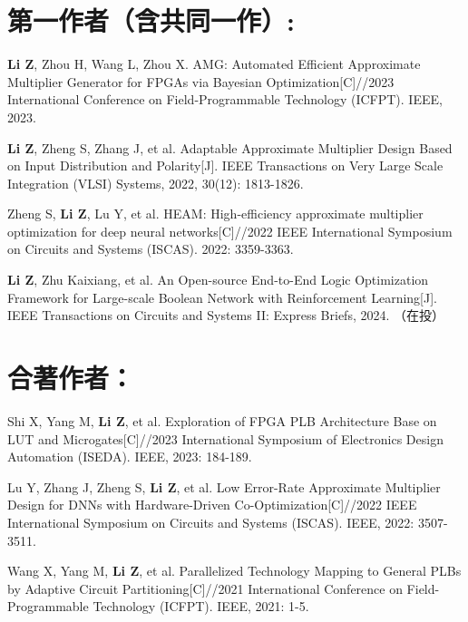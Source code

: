 \section*{第一作者（含共同一作）:}
\begin{enumerate}[label={[\arabic*]}]
  \item \textbf{Li Z}, Zhou H, Wang L, Zhou X. AMG: Automated Efficient Approximate Multiplier Generator for FPGAs via Bayesian Optimization[C]//2023 International Conference on Field-Programmable Technology (ICFPT). IEEE, 2023.
  \item \textbf{Li Z}, Zheng S, Zhang J, et al. Adaptable Approximate Multiplier Design Based on Input Distribution and Polarity[J]. IEEE Transactions on Very Large Scale Integration (VLSI) Systems, 2022, 30(12): 1813-1826.
  \item Zheng S, \textbf{Li Z}, Lu Y, et al. HEAM: High-efficiency approximate multiplier optimization for deep neural networks[C]//2022 IEEE International Symposium on Circuits and Systems (ISCAS). 2022: 3359-3363.
  \item \textbf{Li Z}, Zhu Kaixiang, et al. An Open-source End-to-End Logic Optimization Framework for Large-scale Boolean Network with Reinforcement Learning[J]. IEEE Transactions on Circuits and Systems II: Express Briefs, 2024. （在投）
\end{enumerate}

\vspace{5pt}
\section*{合著作者：}
\begin{enumerate}[label={[\arabic*]}]
  \item Shi X, Yang M, \textbf{Li Z}, et al. Exploration of FPGA PLB Architecture Base on LUT and Microgates[C]//2023 International Symposium of Electronics Design Automation (ISEDA). IEEE, 2023: 184-189.
  \item Lu Y, Zhang J, Zheng S, \textbf{Li Z}, et al. Low Error-Rate Approximate Multiplier Design for DNNs with Hardware-Driven Co-Optimization[C]//2022 IEEE International Symposium on Circuits and Systems (ISCAS). IEEE, 2022: 3507-3511.
  \item Wang X, Yang M, \textbf{Li Z}, et al. Parallelized Technology Mapping to General PLBs by Adaptive Circuit Partitioning[C]//2021 International Conference on Field-Programmable Technology (ICFPT). IEEE, 2021: 1-5.
\end{enumerate}

\fi